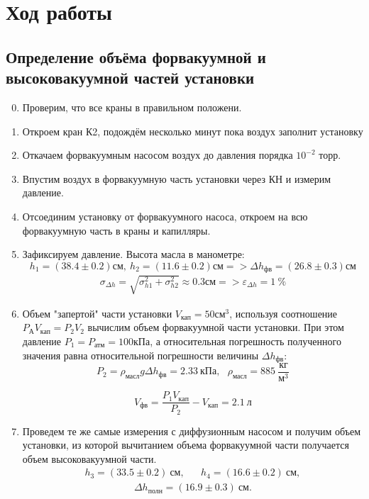 \documentclass[11pt,a4paper]{article}
\begin{document}
\section*{Ход работы}
\subsection*{Определение объёма форвакуумной и высоковакуумной
частей установки}
\begin{enumerate}
  \setcounter{enumi}{-1}
  \item Проверим, что все краны в правильном положени.
  \item Откроем кран К2, подождём несколько минут пока воздух заполнит установку
  \item Откачаем форвакуумным насосом воздух до давления порядка $10^{-2}$ торр.
  \item Впустим воздух в форвакуумную часть установки через КН и измерим давление.
  \item Отсоединим установку от форвакуумного насоса, откроем на всю форвакуумную часть
 в краны и капилляры.
 
  \item Зафиксируем давление. Высота масла в манометре: 
   \[ h_1 = (38.4 \pm 0.2)\text{см},\  h_2 = (11.6 \pm 0.2) \text{см} => \Delta h_\text{фв} = (26.8 \pm 0.3) \text{см}\]
  \begin{align}
    \sigma_{\Delta h} = \sqrt{\sigma_{h1}^2 + \sigma_{h2}^2}\approx 0.3 \text{см} => \varepsilon_{\Delta h} = 1 \ \% 
  \end{align}
  
  
  \item Объем "запертой" части установки $V_\text{кап} = 50 \text{см}^3$, используя соотношение $P_\text{А} V_\text{кап}=P_2 V_2$ вычислим объем форвакуумной части установки. 
  При этом давление $P_1 = P_\text{атм} = 100 \text{кПа}$, а относительная погрешность полученного 
  значения равна относительной погрешности величины $\Delta h_\text{фв} $:
  \[P_2 = \rho_\text{масл} g \Delta h_\text{фв} = 2.33 \ \text{кПа}, \ \ \  \rho_\text{масл} = 885 \ \frac{\text{кг}}{\text{м}^3}\]
  
  \begin{equation}
    V_{фв} = \frac{P_1 V_{кап}}{P_2} - V_{кап} = 2.1 \ л
  \end{equation}
  
  
  \item Проведем те же самые измерения с диффузионным насосом и получим объем установки, из которой вычитанием объема форвакуумной части получается объем высоковакуумной части. 
  \begin{align}
    h_3 = (33.5 \pm 0.2) ~см, && h_4 = (16.6 \pm 0.2) ~см,
  \end{align}
  \begin{align}
    \Delta h_{полн} = (16.9 \pm 0.3) ~см.
  \end{align}


\end{enumerate}
\end{document}
